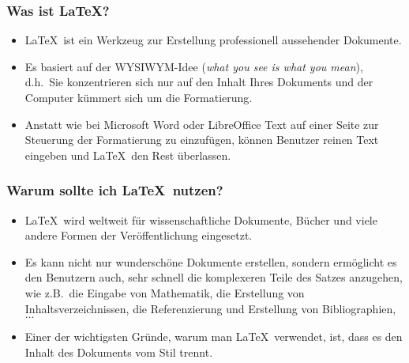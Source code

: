 \mode*

\setmonofont{Verdana}

\begin{frame}[fragile]
    \frametitle<presentation>{Was ist \LaTeX?}

    \begin{itemize}
        \item \LaTeX\ ist ein Werkzeug zur Erstellung professionell aussehender Dokumente.
        \item Es basiert auf der WYSIWYM-Idee (\emph{what you see is what you mean}),
        d.h.~Sie konzentrieren sich nur auf den Inhalt Ihres Dokuments und der Computer
        kümmert sich um die Formatierung.
        \item Anstatt wie bei Microsoft Word oder LibreOffice Text auf einer Seite zur
        Steuerung der Formatierung zu einzufügen, können Benutzer reinen Text
        eingeben und \LaTeX\ den Rest überlassen.
    \end{itemize}
\end{frame}

\begin{frame}[fragile]
    \frametitle<presentation>{Warum sollte ich \LaTeX\ nutzen?}

    \begin{itemize}
        \item\LaTeX\ wird weltweit für wissenschaftliche Dokumente, Bücher und
        viele andere Formen der Veröffentlichung eingesetzt.
        \item Es kann nicht nur wunderschöne Dokumente erstellen, sondern
        ermöglicht es den Benutzern auch, sehr schnell die komplexeren Teile
        des Satzes anzugehen, wie z.B.~die Eingabe von Mathematik, die Erstellung
        von Inhaltsverzeichnissen, die Referenzierung und Erstellung von
        Bibliographien,$\ldots$
        \item Einer der wichtigsten Gründe, warum man \LaTeX\ verwendet, ist,
        dass es den Inhalt des Dokuments vom Stil trennt.
    \end{itemize}

\end{frame}


